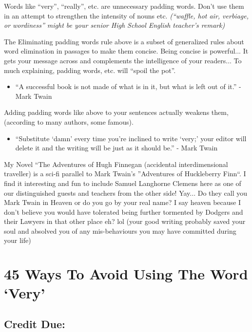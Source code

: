 \documentclass[openleft,oneside,showtrims]{memoir}
\begin{document}
Words like ``very'', ``really'', etc. are unnecessary padding words.  Don't use them in an attempt to strengthen the intensity of nouns etc. \emph{(``waffle, hot air, verbiage, or wordiness'' might be your senior High School English teacher's remark)}

The Eliminating padding words rule above is a subset of generalized rules about word elimination in passages to make them concise.  Being concise is powerful... It gets your message across and complements the intelligence of your readers...  To much explaining, padding words, etc. will ``spoil the pot''.

\begin{itemize}
\item ``A successful book is not made of what is in it, but what is left out of it.'' - Mark Twain
\end{itemize}

Adding padding words like above to your sentences actually weakens them, (according to many authors, some famous).  

\begin{itemize}
\item ``Substitute `damn' every time you’re inclined to write `very;' your editor will delete it and the writing will be just as it should be.'' - Mark Twain
\end{itemize}

My Novel ``The Adventures of Hugh Finnegan (accidental interdimensional traveller) is a sci-fi parallel to Mark Twain's ''Adventures of Huckleberry Finn``.  I find it interesting and fun to include Samuel Langhorne Clemens here as one of our distinguished guests and teachers from the other side!  Yay... Do they call you Mark Twain in Heaven or do you go by your real name?  I say heaven because I don't believe you would have tolerated being further tormented by Dodgers and their Lawyers in that other place eh? lol (your good writing probably saved your soul and absolved you of any mis-behaviours you may have committed during your life)

\section{45 Ways To Avoid Using The Word ‘Very’}
\label{sec:org5c14b49}
\subsection{Credit Due:}
\label{sec:org0904f52}
\end{document}
